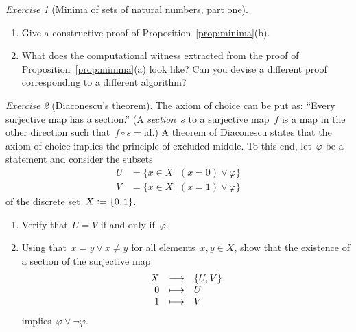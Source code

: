 \documentclass[10pt,reqno,a4paper,openany]{amsbook}
\theoremstyle{definition}
\theoremstyle{plain}
\theoremstyle{remark}
\newcommand{\?}{\,{:}\,}
\renewcommand{\_}{\mathpunct{.}\,}
\newcommand{\defeq}{\vcentcolon=}
\newtheorem{exercise}{Exercise}[chapter]
\begin{document}
\begin{exercise}[Minima of sets of natural numbers, part one]\label{ex:minima1}
\begin{enumerate}
\item Give a constructive proof of Proposition~\ref{prop:minima}(b).
\item What does the computational witness extracted from the proof of
Proposition~\ref{prop:minima}(a) look like? Can you devise a different proof
corresponding to a different algorithm?
\end{enumerate}
\end{exercise}

\begin{exercise}[Diaconescu's theorem]
\label{ex:diaconescu}
The axiom of choice can be put as: ``Every surjective map has a
section.'' (A \emph{section}~$s$ to a surjective map~$f$ is a map in the other direction such that~$f \circ s =
\mathrm{id}$.) A theorem of Diaconescu states that
the axiom of choice implies the principle of excluded middle. To this end, let~$\varphi$ be a
statement and consider the subsets
\begin{align*}
  U &= \{ x \in X \,|\, (x = 0) \vee \varphi \} \\
  V &= \{ x \in X \,|\, (x = 1) \vee \varphi \}
\end{align*}
of the discrete set~$X \defeq \{ 0,1 \}$.
\begin{enumerate}
\item Verify that~$U = V$ if and only if~$\varphi$.
\item Using that~$x = y \vee x \neq y$ for all elements~$x,y \in X$, show that
the existence of a section of the surjective map
\[ \begin{array}{@{}rcl@{}}
  X &\longrightarrow& \{U,V\} \\
  0 &\longmapsto& U \\
  1 &\longmapsto& V
\end{array} \]
implies~$\varphi \vee \neg\varphi$.
\end{enumerate}
\end{exercise}

\end{document}
